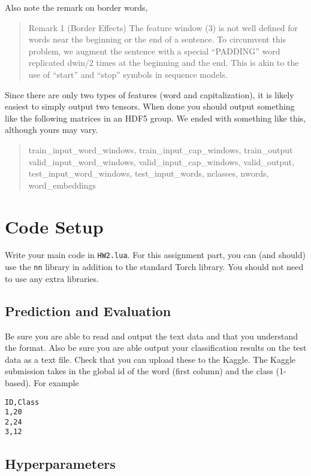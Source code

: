 \documentclass[11pt]{article}
\begin{document}
Also note the remark on border words, 

\begin{quote}
Remark 1 (Border Effects) The feature window (3) is not well defined for words near
the beginning or the end of a sentence. To circumvent this problem, we augment the sentence
with a special “PADDING” word replicated dwin/2 times at the beginning and the end. This
is akin to the use of “start” and “stop” symbols in sequence models.
\end{quote}

Since there are only two types of features (word and capitalization),
it is likely easiest to simply output two tensors. When done you
should output something like the following matrices in an HDF5
group. We ended with something like this, although yours may vary.

\begin{quote}
  train\_input\_word\_windows, train\_input\_cap\_windows,
  train\_output valid\_input\_word\_windows,
  valid\_input\_cap\_windows, valid\_output,
  test\_input\_word\_windows, test\_input\_words, nclasses, nwords,
  word\_embeddings
\end{quote}

\section{Code Setup}

Write your main code in \texttt{HW2.lua}. For this assignment part,
you can (and should) use the \texttt{nn} library in addition to the
standard Torch library. You should not need to use any extra libraries.

\subsection{Prediction and Evaluation}

Be sure you are able to read and output the text data and that you
understand the format.  Also be sure you are able output your
classification results on the test data as a text file. Check that you
can upload these to the Kaggle. The Kaggle submission takes in the
global id of the word (first column) and the class (1-based). For
example

\begin{verbatim}
ID,Class
1,20
2,24
3,12
\end{verbatim}

\subsection{Hyperparameters}
\end{document}
